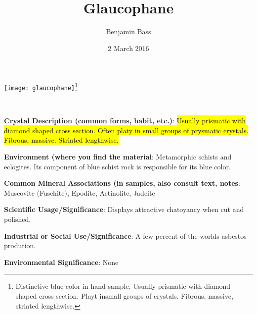 \documentclass[10pt]{article}
\author{Benjamin Bass}
\date{2 March 2016}
\title{\vspace{-2.0cm}Glaucophane} %
\begin{document}
\maketitle


\begin{center}
  \texttt{[image: glaucophane]}\footnote{Distinctive blue color in hand sample. Usually prismatic with diamond shaped cross section. Playt insmall groups of crystals. Fibrous, massive, striated lengthwise.}
\end{center}



\
\
\
\
\
\
\
\
\
\

\begin{framed}
  \textbf{Crystal Description (common forms, habit, etc.)}: \hl{Usually prismatic with diamond shaped cross section. Often platy in small groups of prysmatic crystals. Fibrous, massive. Striated lengthwise.}
\end{framed}

\begin{framed}
  \textbf{Environment (where you find the material}: Metamorphic schists and eclogites. Its component of blue schist rock is responsible for its blue color.
\end{framed}

\begin{framed}
  \textbf{Common Mineral Associations (in samples, also consult text, notes}: Muscovite (Fuschite), Epodite, Actinolite, Jadeite
\end{framed}

\begin{framed}
  \textbf{Scientific Usage/Significance}: Displays attractive chatoyancy when cut and polished.
\end{framed}

\begin{framed}
  \textbf{Industrial or Social Use/Significance}: A few percent of the worlds asbestos prodution.
\end{framed}

\begin{framed}
  \textbf{Environmental Significance}: None
\end{framed}

\end{document}
